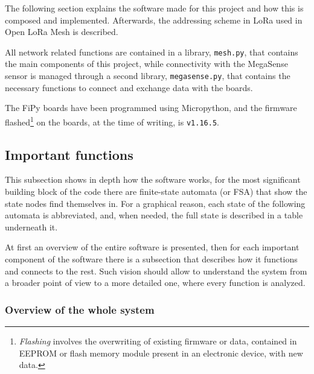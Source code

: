 		The following section explains the software made for this project and how this is composed and implemented.
		Afterwards, the addressing scheme in LoRa used in Open LoRa Mesh is described.
		
		All network related functions are contained in a library, \texttt{mesh.py}, that contains the main components of this project, while connectivity with the MegaSense sensor is managed through a second library, \texttt{megasense.py}, that contains the necessary functions to connect and exchange data with the boards.
		
		The FiPy boards have been programmed using Micropython, and the firmware flashed\footnote{ \textit{Flashing} involves the overwriting of existing firmware or data, contained in EEPROM or flash memory module present in an electronic device, with new data.} on the boards, at the time of writing, is \texttt{v1.16.5}.
		
		\subsection{Important functions}\label{subsec:algorithms}
	
			

			This subsection shows in depth how the software works, for the most significant building block of the code there are finite-state automata (or FSA) that show the state nodes find themselves in.
			For a graphical reason, each state of the following automata is abbreviated, and, when needed, the full state is described in a table underneath it.
			
			At first an overview of the entire software is presented, then for each important component of the software there is a subsection that describes how it functions and connects to the rest.
			Such vision should allow to understand the system from a broader point of view to a more detailed one, where every function is analyzed.
			
			\subsubsection{Overview of the whole system}
			
